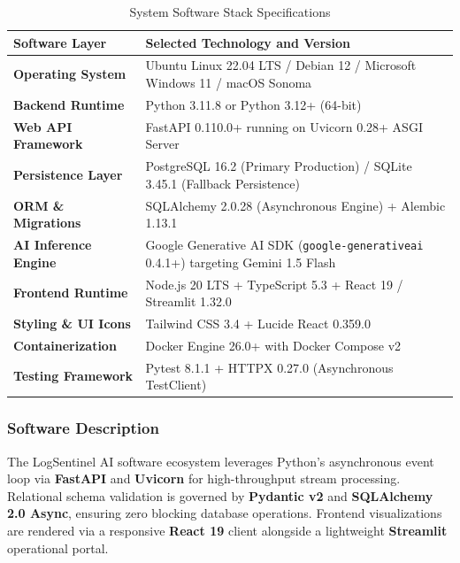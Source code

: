 \documentclass[12pt,a4paper]{article}
\begin{document}
\begin{table}[H]
\centering
\caption{System Software Stack Specifications}
\label{tab:software_specs}
\renewcommand{\arraystretch}{1.3}
\begin{tabularx}{\textwidth}{|>{\raggedright\arraybackslash}p{3.8cm}|>{\raggedright\arraybackslash}X|}
\hline
\textbf{Software Layer} & \textbf{Selected Technology and Version} \\
\hline
\textbf{Operating System} & Ubuntu Linux 22.04 LTS / Debian 12 / Microsoft Windows 11 / macOS Sonoma \\
\hline
\textbf{Backend Runtime} & Python 3.11.8 or Python 3.12+ (64-bit) \\
\hline
\textbf{Web API Framework} & FastAPI 0.110.0+ running on Uvicorn 0.28+ ASGI Server \\
\hline
\textbf{Persistence Layer} & PostgreSQL 16.2 (Primary Production) / SQLite 3.45.1 (Fallback Persistence) \\
\hline
\textbf{ORM \& Migrations} & SQLAlchemy 2.0.28 (Asynchronous Engine) + Alembic 1.13.1 \\
\hline
\textbf{AI Inference Engine} & Google Generative AI SDK (\texttt{google-generativeai} 0.4.1+) targeting Gemini 1.5 Flash \\
\hline
\textbf{Frontend Runtime} & Node.js 20 LTS + TypeScript 5.3 + React 19 / Streamlit 1.32.0 \\
\hline
\textbf{Styling \& UI Icons} & Tailwind CSS 3.4 + Lucide React 0.359.0 \\
\hline
\textbf{Containerization} & Docker Engine 26.0+ with Docker Compose v2 \\
\hline
\textbf{Testing Framework} & Pytest 8.1.1 + HTTPX 0.27.0 (Asynchronous TestClient) \\
\hline
\end{tabularx}
\end{table}

\subsubsection{Software Description}\label{sec:software_desc}
The LogSentinel AI software ecosystem leverages Python's asynchronous event loop via \textbf{FastAPI} and \textbf{Uvicorn} for high-throughput stream processing. Relational schema validation is governed by \textbf{Pydantic v2} and \textbf{SQLAlchemy 2.0 Async}, ensuring zero blocking database operations. Frontend visualizations are rendered via a responsive \textbf{React 19} client alongside a lightweight \textbf{Streamlit} operational portal.
\end{document}
